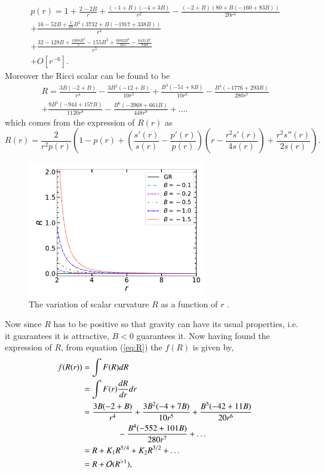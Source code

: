 \documentclass[12pt,a4paper,oneside]{book}
\newcommand{\eq}[2]{\begin{equation} \label{eq:#1} #2 \end{equation}}
\newcommand{\meq}[2]{\begin{multline}\label{eq:#1} #2 \end{multline}}
\newcommand{\Eref}[1]{(\ref{eq:#1})}
\begin{document}
\meq{5}{
p\left(r\right)= 1+\frac{2-2B}{r}+\frac{(-1+B)(-4+3B)}{r^2}-\frac{\left(-2+B\right)\left(80+B\left(-160+83B\right)\right)}{20r^3}
\\+\frac{16-52B+\frac{1}{60}B^2\left(3732+B\left(-1917+338B\right)\right)}{r^4}
\\+\frac{32-128B+\frac{1008B^2}{5}-155B^3+\frac{6002B^4}{105}-\frac{6431B^5}{840}}{r^5}\\+O\left[r^{-6}\right].
}
Moreover the Ricci scalar can be found to be
\meq{R}{R = \frac{3 B(-2+B)}{r^4}-\frac{3 B^2(-12+B)}{10 r^5}+\frac{B^3 (-51+8 B)}{10 r^6}-\frac{B^4 (-1776+293 B)}{280 r^7}\\+\frac{9 B^5 (-944+157B)}{1120 r^8}-\frac{B^6 (-3968+661 B)}{448 r^9}+\dots.}
which comes from the expression of $R(r)$ as \cite{Mut_Vij_06}
\eq{R_expr}{R(r) = \frac{2}{r^2p(r)}\left(1-p(r)+\left(\frac{s'(r)}{s(r)}-\frac{p'(r)}{p(r)}\right)\left(r-\frac{r^2s'(r)}{4s(r)}\right)+\frac{r^2s''(r)}{2s(r)}\right).}
\begin{figure}[t]
    \centering
    \includegraphics[width=0.7\textwidth]{Ricci.pdf}
	\caption{The variation of scalar curvature $R$ as a function of $r$ \cite{Kalita_Bani}.  }
        \label{Ricci}
\end{figure}
Now since $R$ has to be positive so that gravity can have its usual properties, i.e. it guarantees it is attractive, $B<0$ guarantees it. Now having found the expression of $R$, from equation \Eref{R} the $f(R)$ is given by,
\begin{align}
f(R(r)) &= \int F(R) dR \nonumber \\
&= \int F(r) \frac{dR}{dr}dr  \nonumber\\
&= \frac{3 B(-2+B)}{r^4}+\frac{3 B^2(-4+7B)}{10 r^5}+\frac{B^3 (-42+ 11B)}{20 r^6}\nonumber\\& \hspace{1.5cm}-\frac{B^4 (-552+101 B)}{280 r^7}+\dots  \\
\label{eq:f_R}
&= R+K_1R^{5/4}+K_2R^{3/2}+\dots \nonumber\\
&= R+\mathcal{O}(R^{>1}),
\end{align}
\end{document}
